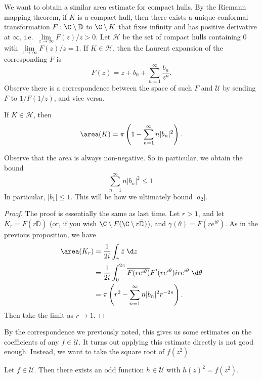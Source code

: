 \documentclass[a4paper]{article}
\renewcommand\D{\mathbb{D}}
\begin{document}
We want to obtain a similar area estimate for compact hulls. By the Riemann mapping theorem, if $K$ is a compact hull, then there exists a unique conformal transformation $F: \C \setminus \bar{\D}$ to $\C \setminus K$ that fixes infinity and has positive derivative at $\infty$, i.e.\ $\lim\limits_{z \to \infty} F(z)/z > 0$. Let $\mathcal{H}$ be the set of compact hulls containing $0$ with $\lim\limits_{z\to \infty} F(z)/z = 1$. If $K \in \mathcal{H}$, then the Laurent expansion of the corresponding $F$ is
\[
  F(z) = z + b_0 + \sum_{n = 1}^\infty \frac{b_n}{z^n}.
\]
Observe there is a correspondence between the space of such $F$ and $\mathcal{U}$ by sending $F$ to $1/F(1/z)$, and vice versa.
\begin{prop}
  If $K \in \mathcal{H}$, then
  \[
    \area (K) = \pi \left(1 - \sum_{n = 1}^\infty n|b_n|^2\right).
  \]
\end{prop}
Observe that the area is always non-negative. So in particular, we obtain the bound
\[
  \sum_{n = 1}^\infty n |b_n|^2 \leq 1.
\]
In particular, $|b_1| \leq 1$. This will be how we ultimately bound $|a_2|$.
\begin{proof}
  The proof is essentially the same as last time. Let $r > 1$, and let $K_r = F(r \bar{\D})$ (or, if you wish $\C \setminus F(\C \setminus r\bar{\D})$), and $\gamma(\theta) = F(r e^{i\theta})$. As in the previous proposition, we have
  \begin{align*}
    \area(K_r) &= \frac{1}{2i} \int_\gamma \bar{z} \;\d z\\
    &= \frac{1}{2i} \int_0^{2\pi} \overline{F(re^{i\theta})}F'(re^{i\theta}) ir e^{i\theta}\;\d \theta\\
    &= \pi \left(r^2 - \sum_{n = 1}^\infty n |b_n|^2 r^{-2n}\right).
  \end{align*}
  Then take the limit as $r \to 1$.
\end{proof}
By the correspondence we previously noted, this gives us some estimates on the coefficients of any $f \in \mathcal{U}$. It turns out applying this estimate directly is not good enough. Instead, we want to take the square root of $f(z^2)$.

\begin{lemma}
  Let $f \in \mathcal{U}$. Then there exists an odd function $h \in \mathcal{U}$ with $h(z)^2 = f(z^2)$.
\end{lemma}
\end{document}
